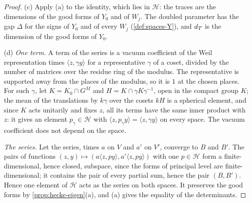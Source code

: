 \begin{proof}
(c) Apply (a) to the identity, which lies in $\mathcal H$: the traces are the dimensions of the good forms of $Y_0$ and of $W_j$. The doubled parameter has the gap $\Delta$ for the signs of $Y_0$ and of every $W_j$ (\cref{def:spaces-Y}), and $d_T$ is the dimension of the good forms of $Y_0$.

(d) \emph{One term.} A term of the series is a vacuum coefficient of the Weil representation times $\langle z,\gamma y\rangle$ for a representative $\gamma$ of a coset, divided by the number of matrices over the residue ring of the modulus. The representative is supported away from the places of the modulus, so it is $1$ at the chosen places. For such $\gamma$, let $K=K_0\cap G^M$ and $H=K\cap\gamma K\gamma^{-1}$, open in the compact group $K$; the mean
of the translations by $k\gamma$ over the cosets $kH$ is a spherical element, and since $K$ acts unitarily and fixes $z$, all its terms have the same inner product with $z$: it gives an element $p_\gamma\in\mathcal H$ with $\langle z,p_\gamma y\rangle=\langle z,\gamma y\rangle$ on every space. The vacuum coefficient does not depend on the space.

\emph{The series.} Let the series, times $a$ on $V$ and $a'$ on $V'$, converge to $B$ and $B'$. The pairs of functions $(z,y)\mapsto(a\langle z,py\rangle,a'\langle z,py\rangle)$ with one $p\in\mathcal H$ form a finite-dimensional, hence closed, subspace, since the forms of principal level are finite-dimensional; it contains the pair of every partial sum, hence the pair $(B,B')$. Hence one element of $\mathcal H$ acts as the series on both spaces. It preserves the good forms by
\cref{prop:hecke-eigen}(a), and (a) gives the equality of the determinants.
\end{proof}
